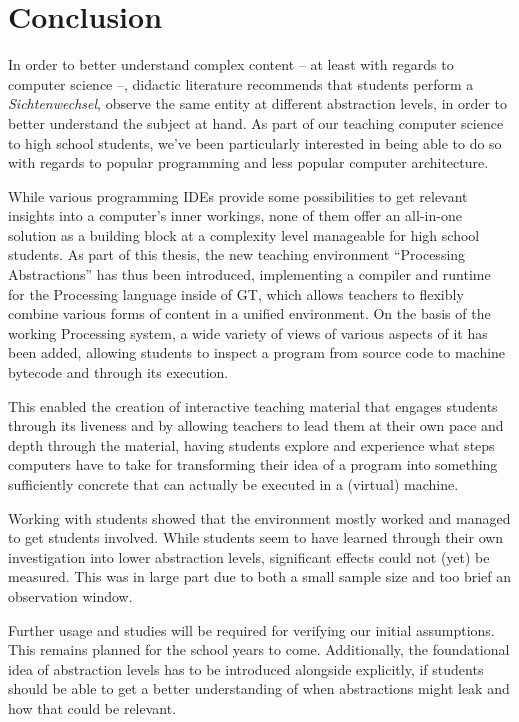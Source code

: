 
\chapter{Conclusion} \label{ch_conclusion}

In order to better understand complex content -- at least with regards to computer science --, didactic literature recommends that students perform a \emph{Sichtenwechsel}, \ie observe the same entity at different abstraction levels, in order to better understand the subject at hand. As part of our teaching computer science to high school students, we've been particularly interested in being able to do so with regards to popular programming and less popular computer architecture.

While various programming \acp{IDE} provide some possibilities to get relevant insights into a computer's inner workings, none of them offer an all-in-one solution as a building block at a complexity level manageable for high school students. As part of this thesis, the new teaching environment ``Processing Abstractions'' has thus been introduced, implementing a compiler and runtime for the Processing language inside of \acf{GT}, which allows teachers to flexibly combine various forms of content in a unified environment. On the basis of the working Processing system, a wide variety of views of various aspects of it has been added, allowing students to inspect a program from source code to machine bytecode and through its execution.

This enabled the creation of interactive teaching material that engages students through its liveness and by allowing teachers to lead them at their own pace and depth through the material, having students explore and experience what steps computers have to take for transforming their idea of a program into something sufficiently concrete that can actually be executed in a (virtual) machine.

Working with students showed that the environment mostly worked and managed to get students involved. While students seem to have learned through their own investigation into lower abstraction levels, significant effects could not (yet) be measured. This was in large part due to both a small sample size and too brief an observation window.

Further usage and studies will be required for verifying our initial assumptions. This remains planned for the school years to come. Additionally, the foundational idea of abstraction levels has to be introduced alongside explicitly, if students should be able to get a better understanding of when abstractions might leak and how that could be relevant.



